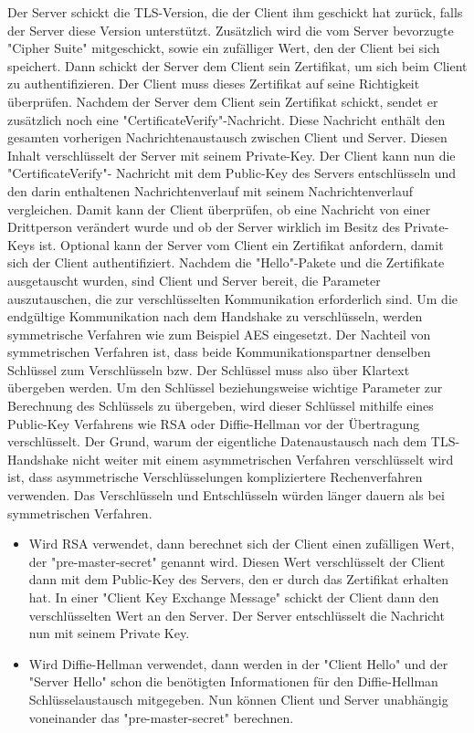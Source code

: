 Der Server schickt die TLS-Version, die der Client ihm geschickt hat zurück, falls der Server diese Version unterstützt. Zusätzlich wird die vom Server bevorzugte "Cipher Suite" mitgeschickt, sowie ein zufälliger Wert, den der Client bei sich speichert. Dann schickt der Server dem Client sein Zertifikat, um sich beim Client zu authentifizieren. Der Client muss dieses Zertifikat auf seine Richtigkeit überprüfen. Nachdem der Server dem Client sein Zertifikat schickt, sendet er zusätzlich noch eine "CertificateVerify"-Nachricht. Diese Nachricht enthält den gesamten vorherigen Nachrichtenaustausch zwischen Client und Server. Diesen Inhalt verschlüsselt der Server mit seinem Private-Key. Der Client kann nun die "CertificateVerify"- Nachricht mit dem Public-Key des Servers entschlüsseln und den darin enthaltenen Nachrichtenverlauf mit seinem Nachrichtenverlauf vergleichen. Damit kann der Client überprüfen, ob eine Nachricht von einer Drittperson verändert wurde und ob der Server wirklich im Besitz des Private-Keys ist. Optional kann der Server vom Client ein Zertifikat anfordern, damit sich der Client authentifiziert. 
Nachdem die "Hello"-Pakete und die Zertifikate ausgetauscht wurden, sind Client und Server bereit, die Parameter auszutauschen, die zur verschlüsselten Kommunikation erforderlich sind. Um die endgültige Kommunikation nach dem Handshake zu verschlüsseln, werden symmetrische Verfahren wie zum Beispiel AES eingesetzt. Der Nachteil von symmetrischen Verfahren ist, dass beide Kommunikationspartner denselben Schlüssel zum Verschlüsseln bzw. Der Schlüssel muss also über Klartext übergeben werden. Um den Schlüssel beziehungsweise wichtige Parameter zur Berechnung des Schlüssels zu übergeben, wird dieser Schlüssel mithilfe eines Public-Key Verfahrens wie RSA oder Diffie-Hellman vor der Übertragung verschlüsselt. Der Grund, warum der eigentliche Datenaustausch nach dem TLS-Handshake nicht weiter mit einem asymmetrischen Verfahren verschlüsselt wird ist, dass asymmetrische Verschlüsselungen kompliziertere Rechenverfahren verwenden. Das Verschlüsseln und Entschlüsseln würden länger dauern als bei symmetrischen Verfahren.

\begin{itemize}
    \item Wird RSA verwendet, dann berechnet sich der Client einen zufälligen Wert, der "pre-master-secret" genannt wird. Diesen Wert verschlüsselt der Client dann mit dem Public-Key des Servers, den er durch das Zertifikat erhalten hat. In einer "Client Key Exchange Message" schickt der Client dann den verschlüsselten Wert an den Server. Der Server entschlüsselt die Nachricht nun mit seinem Private Key.
    \item Wird Diffie-Hellman verwendet, dann werden in der "Client Hello" und der "Server Hello" schon die benötigten Informationen für den Diffie-Hellman Schlüsselaustausch mitgegeben. Nun können Client und Server unabhängig voneinander das "pre-master-secret" berechnen.
\end{itemize}

